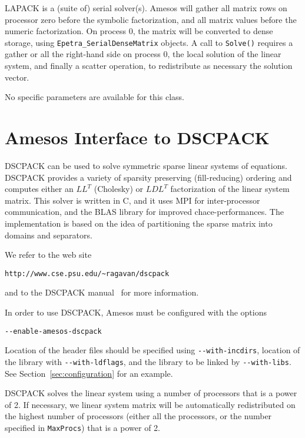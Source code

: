 \documentclass[11pt]{SANDreport}
\begin{document}
\smallskip

LAPACK is a (suite of) serial solver(s). Amesos will gather all matrix rows on processor
zero before the symbolic factorization, and all matrix values before the
numeric factorization. On process 0, the matrix will be converted
to dense storage, using \verb!Epetra_SerialDenseMatrix! objects.
A call to \verb!Solve()! requires a gather
or all the right-hand side on process 0, the local solution of the linear
system, and finally a scatter operation, to redistribute as necessary the
solution vector.

\smallskip

No specific parameters are available for this class.

\section{Amesos Interface to DSCPACK}
\label{sec:dscpack}

DSCPACK can be used to solve symmetric sparse linear systems of equations.
DSCPACK provides a variety of sparsity preserving (fill-reducing) ordering and
computes either an $LL^T$ (Cholesky) or $LDL^T$ factorization of the linear
system matrix. This solver is written in C, and it uses MPI for
inter-processor communication, and the BLAS library for improved
chace-performances. The implementation is based on the idea of partitioning
the sparse matrix into domains and separators. 

We refer to the web site
\begin{verbatim}
http://www.cse.psu.edu/~ragavan/dscpack
\end{verbatim}
and to the DSCPACK manual~\cite{dscpack-manual} for more
information.

\smallskip

In order to use DSCPACK, Amesos must be configured with the options
\begin{verbatim}
--enable-amesos-dscpack 
\end{verbatim}
Location of the header files should be specified using \verb!--with-incdirs!,
location of the library with \verb!--with-ldflags!, and the library
to be linked by \verb!--with-libs!. See Section~\ref{sec:configuration} for an
example.

\smallskip

DSCPACK solves the linear system using a number of processors that is a power
of 2. If necessary, we linear system matrix will be automatically
redistributed on the highest number of processors (either all the
processors, or the number specified in \verb!MaxProcs!) that is a power of 2.
\end{document}
